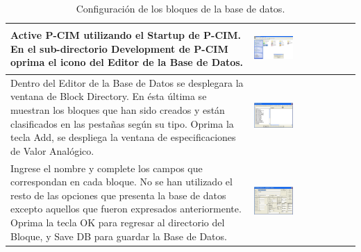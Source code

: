 \begin{table}[ht!]
\centering
\renewcommand*{\arraystretch}{0.01}
\begin{tabular}{*{2}{m{}}}
\hline
  Active P-CIM utilizando el Startup de P-CIM. En el sub-directorio Development 
  de P-CIM oprima el icono del Editor de la Base de Datos.
  &\begin{center}
    \includegraphics[width=0.4\textwidth]
      {Cap5-SCADA/images/startUp.jpeg}
  \end{center}\\
\hline
    Dentro del Editor de la Base de Datos se desplegara la ventana de Block 
    Directory. En ésta última se muestran los bloques que han sido creados y
    están clasificados en las pestañas según su tipo.  Oprima la tecla Add, se 
    despliega la ventana de especificaciones de Valor Analógico.
    &\begin{center}
      \includegraphics[width=0.4\textwidth]
	{Cap5-SCADA/images/database.jpeg}
    \end{center}\\
\hline
    Ingrese el nombre y complete los campos que correspondan en cada bloque. 
    No se han utilizado el resto de las opciones que presenta la base de datos 
    excepto aquellos que fueron expresados anteriormente.
    Oprima la tecla OK para regresar al directorio del Bloque,
    y Save DB para guardar la Base de Datos.
    &\begin{center}
      \includegraphics[width=0.4\textwidth]
	{Cap5-SCADA/images/database1.jpeg}
    \end{center}\\
\hline
\end{tabular}
\caption{Configuración de los bloques de la base de datos.}
\label{tab:confBlockDB}
\end{table}

